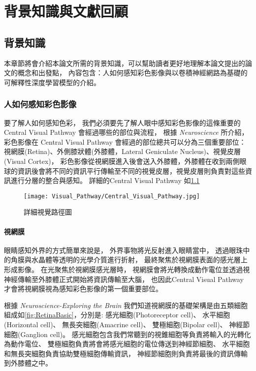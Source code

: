 \documentclass[class=NCU_thesis, crop=false]{standalone}
\begin{document}
\chapter{背景知識與文獻回顧}
\section{背景知識}

本章節將會介紹本論文所需的背景知識，可以幫助讀者更好地理解本論文提出的論文的概念和出發點，
內容包含：人如何感知彩色影像與以卷積神經網路為基礎的可解釋性深度學習模型的介紹。

\subsection{人如何感知彩色影像}

要了解人如何感知色彩，
我們必須要先了解人眼中感知彩色影像的這條重要的 Central Visual Pathway 會經過哪些的部位與流程，
根據 \textit{Neuroscience} \cite{Purves2004Neuroscience3E}所介紹，
彩色影像在 Central Visual Pathway 會經過的部位總共可以分為三個重要部位：視網膜(Retina)、外側膝狀體(外膝體，Lateral Geniculate Nucleus)、視覺皮層(Visual Cortex)，
彩色影像從視網膜進入後會送入外膝體，外膝體在收到兩側眼球的資訊後會將不同的資訊平行傳輸至不同的視覺皮層，視覺皮層則負責對這些資訊進行分層的整合與感知。
詳細的Central Visual Pathway 如\cref{fig:Central_Visual_Pathway}

\begin{figure}[H]
  \centering
  \texttt{[image: Visual\_Pathway/Central\_Visual\_Pathway.jpg]}
  \caption{詳細視覺路徑圖~\cite{Purves2004Neuroscience3E}}
  \label{fig:Central_Visual_Pathway}
\end{figure}

\subsubsection{視網膜}

眼睛感知外界的方式簡單來說是，
外界事物將光反射進入眼睛當中，
透過眼珠中的角膜與水晶體等透明的光學介質進行折射，
最終聚焦於視網膜表面的感光層上形成影像。
在光聚焦於視網膜感光層時，
視網膜會將光轉換成動作電位並透過視神經傳輸至外膝體正式開始將資訊傳輸至大腦，
也因此Central Visual Pathway 才會將視網膜視為感知彩色影像的第一個重要部位。

根據 \textit{Neuroscience-Exploring the Brain} \cite{bear2016neuroscience}
我們知道視網膜的基礎架構是由五類細胞組成如\cref{fig:RetinaBasic}，分別是: 感光細胞(Photoreceptor cell)、 水平細胞(Horizontal cell)、 無長突細胞(Amacrine cell)、 雙極細胞(Bipolar cell)、 神經節細胞(Ganglion cell)。 感光細胞包含我們常聽到的視錐細胞等負責將輸入的光轉化為動作電位、 
雙極細胞負責將會將感光細胞的電位傳送到神經節細胞、
水平細胞和無長突細胞負責協助雙極細胞傳輸資訊，
神經節細胞則負責將最後的資訊傳輸到外膝體之中。
\end{document}
